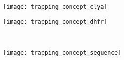 %
\begin{figure*}[t]
  \begin{minipage}{6cm}
    \begin{subfigure}[t]{5.5cm}
      \centering
      \caption{}\vspace{-3mm}\label{fig:trapping_concept_clya}
      \texttt{[image: trapping\_concept\_clya]}
    \end{subfigure}
  \end{minipage}
  \begin{minipage}{6cm}
    \begin{subfigure}[t]{5.5cm}
      \centering
      \caption{}\vspace{-3mm}\label{fig:trapping_concept_dhfr}
      \texttt{[image: trapping\_concept\_dhfr]}
    \end{subfigure}
    \\
    \begin{subfigure}[t]{5.5cm}
      \centering
      \caption{}\vspace{-3mm}\label{fig:trapping_concept_sequence}
      \texttt{[image: trapping\_concept\_sequence]}
    \end{subfigure}
  \end{minipage}


\end{figure*}
